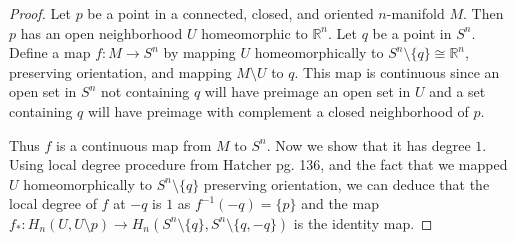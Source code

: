\documentclass[10pt]{article}
\newcommand{\bb}[1]{\mathbb{#1}}
\theoremstyle{remark}
\begin{document}
\begin{proof}
  Let $p$ be a point in a connected, closed, and oriented $n$-manifold $M$.
  Then $p$ has an open neighborhood $U$ homeomorphic to $\bb{R}^n$. Let $q$
  be a point in $S^n$. Define a map $f:M\rightarrow S^n$ by mapping $U$ homeomorphically
  to $S^n\setminus\{q\}\cong \bb{R}^n$, preserving orientation,
  and mapping $M\setminus U$ to $q$. This map is continuous since an open set in $S^n$
  not containing $q$ will have preimage an open set in $U$ and a set containing
  $q$ will have preimage with complement a closed neighborhood of $p$.

  Thus $f$ is a continuous map from $M$ to $S^n$. Now we show that it has
  degree $1$. Using local degree procedure from Hatcher pg. 136, and the fact
  that we mapped $U$ homeomorphically to $S^n\setminus\{q\}$ preserving orientation, we
  can deduce that the local degree of $f$ at $-q$ is $1$ as
  $f^{-1}(-q)=\{p\}$ and the map $f_*:H_n(U,U\setminus p)\rightarrow H_n(S^n\setminus \{q\},S^n\setminus\{q,-q\})$ is
  the identity map.
\end{proof}
\end{document}
